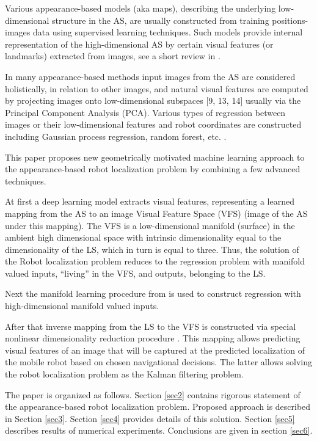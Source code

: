 \documentclass[conference]{IEEEtran} %
\begin{document}
Various appearance-based models (aka maps), describing the underlying low-dimensional structure in the AS, are usually constructed from training positions-images data using supervised learning techniques. Such models provide internal representation of the high-dimensional AS by certain visual features (or landmarks) extracted from images, see a short review in \cite{bib12}.

In many appearance-based methods input images from the AS are considered holistically, in relation to other images, and natural visual features are computed by projecting images onto low-dimensional subspaces [9, 13, 14] usually via the Principal Component Analysis (PCA). Various types of regression between images or their low-dimensional features and robot coordinates are constructed including Gaussian process regression, random forest, etc. \cite{bib15,bib16,bib17,bib18,bib19,burn1,burn2,burn3}.

This paper proposes new geometrically motivated machine learning approach to the appearance-based robot localization problem by combining a few advanced techniques.

At first a deep learning model extracts visual features, representing a learned mapping from the AS to an image Visual Feature Space (VFS) (image of the AS under this mapping). The VFS is a low-dimensional manifold (surface) in the ambient high dimensional space with intrinsic dimensionality equal to the dimensionality of the LS, which in turn is equal to three. Thus, the solution of the Robot localization problem reduces to the regression problem with manifold valued inputs, ``living'' in the VFS, and outputs, belonging to the LS.

Next the manifold learning procedure from \cite{bib20} is used to construct regression with high-dimensional manifold valued inputs.

After that inverse mapping from the LS to the VFS is constructed via special nonlinear dimensionality reduction procedure \cite{bib21,bib22,bib23}. This mapping allows predicting visual features of an image that will be captured at the predicted localization of the mobile robot based on chosen navigational decisions. The latter allows solving the robot localization problem as the Kalman filtering problem.

The paper is organized as follows. Section \ref{sec2} contains rigorous statement of the appearance-based robot localization problem. Proposed approach is described in Section \ref{sec3}. Section \ref{sec4} provides details of this solution. Section \ref{sec5} describes results of numerical experiments. Conclusions are given in section \ref{sec6}.
\end{document}
